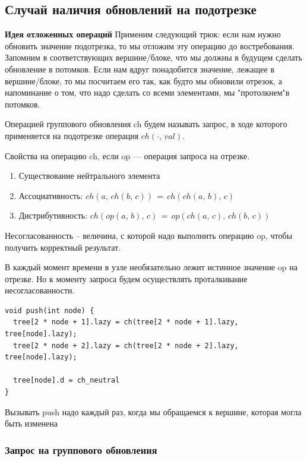 \subsection*{Случай наличия обновлений на подотрезке}

\textbf{Идея отложенных операций} 
Применим следующий трюк: если нам нужно обновить значение подотрезка, то мы отложим эту операцию до востребования. Запомним в соответствующих вершине/блоке, что мы должны в будущем сделать обновление в потомков. Если нам вдруг понадобится значение, лежащее в вершине/блоке, то мы посчитаем его так, как будто мы обновили отрезок, а напоминание о том, что надо сделать со всеми элементами, мы "протолкнем"в потомков.

\Def Операцией группового обновления ch будем называть запрос, в
ходе которого применяется на подотрезке операция $ch(\cdot,\,val)$.

Свойства на операцию ch, если op — операция запроса на отрезке.

\begin{enumerate}
    \item Существование нейтрального элемента
    \item Ассоциативность: $ch(a,\,ch(b,\,c))\,=\,ch(ch(a,\,b),\,c)$
    \item Дистрибутивность: $ch(op(a,\,b),\,c)\,=\,op(ch(a,\,c),\,ch(b,\,c))$
\end{enumerate}

\Def Несогласованность -- величина, с которой надо выполнить операцию op, чтобы получить корректный результат.

В каждый момент времени в узле необязательно лежит истинное значение op на отрезке. Но к моменту запроса будем осуществлять проталкивание несогласованности.

\begin{lstlisting}
void push(int node) {
  tree[2 * node + 1].lazy = ch(tree[2 * node + 1].lazy, tree[node].lazy);
  tree[2 * node + 2].lazy = ch(tree[2 * node + 2].lazy, tree[node].lazy);

  tree[node].d = ch_neutral
}
\end{lstlisting}

Вызывать push надо каждый раз, когда мы обращаемся к вершине, которая могла
быть изменена

\subsubsection{Запрос на группового обновления}

